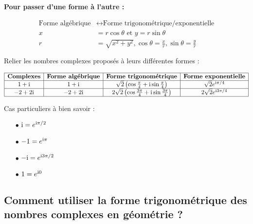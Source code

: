 \medskip

\textbf{Pour passer d'une forme à l'autre :}

\begin{align}
\text{Forme algébrique} &\leftrightarrow \text{Forme trigonométrique/exponentielle} \\
x &= r\cos\theta \text{ et } y = r\sin\theta \\
r &= \sqrt{x^2 + y^2}, \cos\theta = \frac{x}{r}, \sin\theta = \frac{y}{r}
\end{align}

\begin{example}
Relier les nombres complexes proposés à leurs différentes formes :
\bigskip

$\begin{array}{|c|c|c|c|}
\hline
\textbf{Complexes} & \textbf{Forme algébrique} & \textbf{Forme trigonométrique} & \textbf{Forme exponentielle} \\
\hline
1 + \text{i} & 1 + \text{i} & \sqrt{2}\left(\cos\frac{\pi}{4} + \text{i}\sin\frac{\pi}{4}\right) & \sqrt{2}e^{\text{i}\pi/4} \\
\hline
-2 + 2\text{i} & -2 + 2\text{i} & 2\sqrt{2}\left(\cos\frac{3\pi}{4} + \text{i}\sin\frac{3\pi}{4}\right) & 2\sqrt{2}e^{\text{i}3\pi/4} \\
\hline
\end{array}$
\end{example}

\begin{remark}
Cas particuliers à bien savoir :
\begin{itemize}
\item[$  \bullet$] $\text{i} = e^{\text{i}\pi/2}$
\item[$  \bullet$] $-1 = e^{\text{i}\pi}$
\item[$  \bullet$] $-\text{i} = e^{\text{i}3\pi/2}$
\item[$  \bullet$] $1 = e^{\text{i}0}$
\end{itemize}
\end{remark}

\subsection{Comment utiliser la forme trigonométrique des nombres complexes en géométrie ?}

